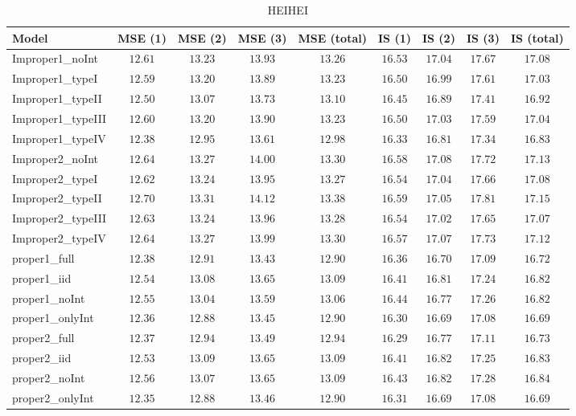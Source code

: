 \begin{table}

\caption{\label{tab:model-choice-sc4}HEIHEI}
\centering
\begin{tabular}{lcccccccc}
\hline
Model  & MSE (1) & MSE (2) & MSE (3) & MSE (total) & IS (1) & IS (2) & IS (3) & \multicolumn{1}{c}{IS (total)} \\ 
\hline
Improper1_noInt  & $12.61$ & $13.23$ & $13.93$ & $13.26$ & $16.53$ & $17.04$ & $17.67$ & $17.08$ \\
Improper1_typeI  & $12.59$ & $13.20$ & $13.89$ & $13.23$ & $16.50$ & $16.99$ & $17.61$ & $17.03$ \\
Improper1_typeII  & $12.50$ & $13.07$ & $13.73$ & $13.10$ & $16.45$ & $16.89$ & $17.41$ & $16.92$ \\
Improper1_typeIII  & $12.60$ & $13.20$ & $13.90$ & $13.23$ & $16.50$ & $17.03$ & $17.59$ & $17.04$ \\
Improper1_typeIV  & $12.38$ & $12.95$ & $13.61$ & $12.98$ & $16.33$ & $16.81$ & $17.34$ & $16.83$ \\
Improper2_noInt  & $12.64$ & $13.27$ & $14.00$ & $13.30$ & $16.58$ & $17.08$ & $17.72$ & $17.13$ \\
Improper2_typeI  & $12.62$ & $13.24$ & $13.95$ & $13.27$ & $16.54$ & $17.04$ & $17.66$ & $17.08$ \\
Improper2_typeII  & $12.70$ & $13.31$ & $14.12$ & $13.38$ & $16.59$ & $17.05$ & $17.81$ & $17.15$ \\
Improper2_typeIII  & $12.63$ & $13.24$ & $13.96$ & $13.28$ & $16.54$ & $17.02$ & $17.65$ & $17.07$ \\
Improper2_typeIV  & $12.64$ & $13.27$ & $13.99$ & $13.30$ & $16.57$ & $17.07$ & $17.73$ & $17.12$ \\
proper1_full  & $12.38$ & $12.91$ & $13.43$ & $12.90$ & $16.36$ & $16.70$ & $17.09$ & $16.72$ \\
proper1_iid  & $12.54$ & $13.08$ & $13.65$ & $13.09$ & $16.41$ & $16.81$ & $17.24$ & $16.82$ \\
proper1_noInt  & $12.55$ & $13.04$ & $13.59$ & $13.06$ & $16.44$ & $16.77$ & $17.26$ & $16.82$ \\
proper1_onlyInt  & $12.36$ & $12.88$ & $13.45$ & $12.90$ & $16.30$ & $16.69$ & $17.08$ & $16.69$ \\
proper2_full  & $12.37$ & $12.94$ & $13.49$ & $12.94$ & $16.29$ & $16.77$ & $17.11$ & $16.73$ \\
proper2_iid  & $12.53$ & $13.09$ & $13.65$ & $13.09$ & $16.41$ & $16.82$ & $17.25$ & $16.83$ \\
proper2_noInt  & $12.56$ & $13.07$ & $13.65$ & $13.09$ & $16.43$ & $16.82$ & $17.28$ & $16.84$ \\
proper2_onlyInt  & $12.35$ & $12.88$ & $13.46$ & $12.90$ & $16.31$ & $16.69$ & $17.08$ & $16.69$ \\
\hline 
\end{tabular}


\end{table}
